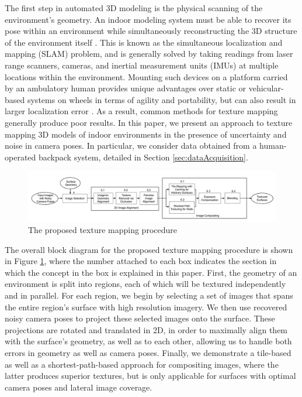 \documentclass[]{spie}  %
\begin{document}
The first step in automated 3D modeling is the physical scanning of
the environment's geometry. An indoor modeling system must be able to
recover its pose within an environment while simultaneously
reconstructing the 3D structure of the environment itself
\cite{chen2010indoor, hz, kua2012loopclosure, liu2010indoor}. This is
known as the simultaneous localization and mapping (SLAM) problem, and
is generally solved by taking readings from laser range scanners,
cameras, and inertial measurement units (IMUs) at multiple locations
within the environment. Mounting such devices on a platform carried by
an ambulatory human provides unique advantages over static or
vehicular-based systems on wheels in terms of agility and portability,
but can also result in larger localization error
\cite{liu2010indoor}. As a result, common methods for texture mapping
generally produce poor results. In this paper, we present an approach
to texture mapping 3D models of indoor environments in the presence of
uncertainty and noise in camera poses. In particular, we consider data
obtained from a human-operated backpack system, detailed in Section
\ref{sec:dataAcquisition}.


\begin{figure}
  \centering
  \includegraphics[width=6.2in]{flowchart2.jpg}
  \caption{The proposed texture mapping procedure\\}
  \label{fig:flowchart}
\end{figure}


The overall block diagram for the proposed texture mapping procedure
is shown in Figure \ref{fig:flowchart}, where the number attached to
each box indicates the section in which the concept in the box is
explained in this paper. First, the geometry of an environment is
split into regions, each of which will be textured independently and
in parallel. For each region, we begin by selecting a set of images
that spans the entire region's surface with high resolution
imagery. We then use recovered noisy camera poses to project these
selected images onto the surface. These projections are rotated and
translated in 2D, in order to maximally align them with the surface's
geometry, as well as to each other, allowing us to handle both errors
in geometry as well as camera poses. Finally, we demonstrate a
tile-based as well as a shortest-path-based approach for compositing
images, where the latter produces superior textures, but is only
applicable for surfaces with optimal camera poses and lateral image
coverage.
\end{document}
